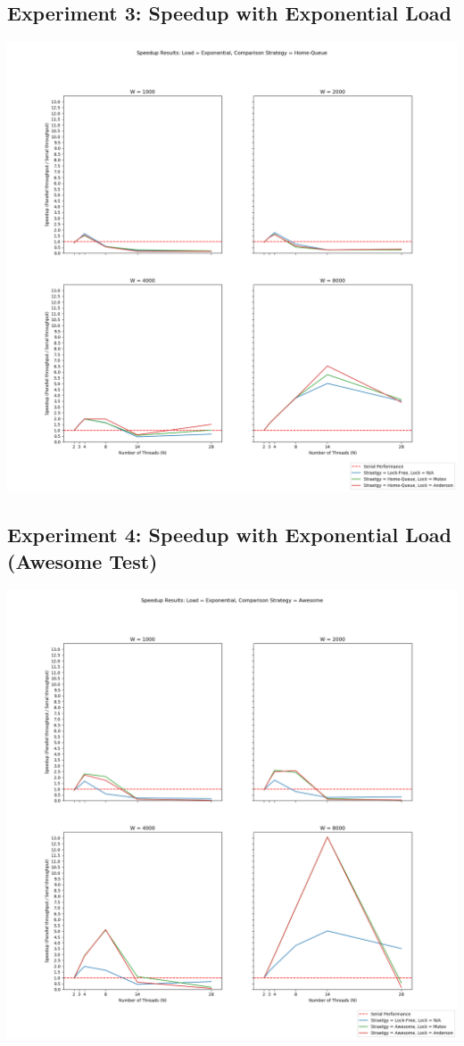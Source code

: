 \documentclass[]{article}
\begin{document}
\subsection{Experiment 3: Speedup with Exponential Load}
\includegraphics[scale=0.5]{graphs/speedup_f:H.png}\\
\subsection{Experiment 4: Speedup with Exponential Load (Awesome Test)}
\includegraphics[scale=0.5]{graphs/speedup_f:A.png}\\
\end{document}
